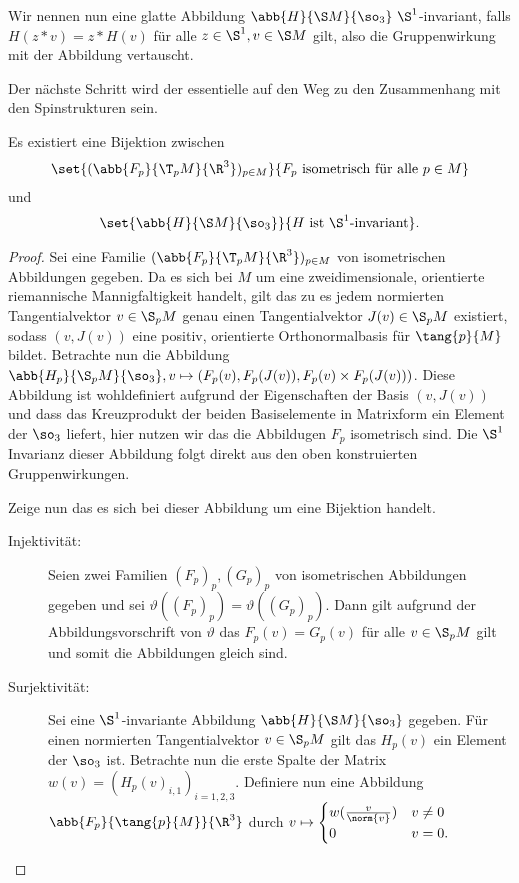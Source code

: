 Wir nennen nun eine glatte Abbildung $ \abb{H}{\S M}{\so_3}~\S^1$-invariant, falls $ H(z*v) = z*H(v) $ für alle $ z \in \S^1, v\in \S M $ gilt, also die Gruppenwirkung mit der Abbildung vertauscht. 
 

Der nächste Schritt wird der essentielle auf den Weg zu den
Zusammenhang mit den Spinstrukturen sein.

\begin{Satz}
  Es existiert eine Bijektion zwischen
  \begin{gather*}
    \set{ (\abb{F_p}{\T_pM}{\R^3})_{p\in M} }{ F_p \text{ isometrisch
        für alle }p \in M}
  \end{gather*}
  und
  \begin{gather*}
    \set{ \abb{H}{\S M}{\so_3}}{H\text{ ist }\S^1 \text{-invariant}}.
  \end{gather*}
  \begin{proof}
    Sei eine Familie $(\abb{F_p}{\T_pM}{\R^3})_{p\in M}$ von
    isometrischen Abbildungen gegeben.  Da es sich bei $M$ um eine
    zweidimensionale, orientierte riemannische Mannigfaltigkeit
    handelt, gilt das zu es jedem normierten Tangentialvektor
    $v \in \S_p M$ genau einen Tangentialvektor $J(v) \in \S_p M$
    existiert, sodass $(v,J(v))$ eine positiv, orientierte
    Orthonormalbasis für $\tang{p}{M}$ bildet. Betrachte nun die
    Abbildung $\abb{H_p}{\S_p%
      M}{\so_3}, v \mapsto (F_p(v),F_p(J(v)),F_p(v)\times F_p(J(v)))$.
    Diese Abbildung ist wohldefiniert aufgrund der Eigenschaften der
    Basis $(v,J(v))$ und dass das Kreuzprodukt der beiden
    Basiselemente in Matrixform ein Element der $\so_3$ liefert, hier nutzen wir das die Abbildugen $ F_p $ isometrisch sind.  Die
    $\S^1$ Invarianz dieser Abbildung folgt direkt aus den oben
    konstruierten Gruppenwirkungen.   
	
    Zeige nun das es sich bei dieser Abbildung um eine Bijektion
    handelt.
    \begin{description}
    \item[Injektivität:] Seien zwei Familien $(F_p)_p,(G_p)_p$ von
      isometrischen Abbildungen gegeben und sei
      $\vartheta((F_p)_p)=\vartheta((G_p)_p)$. Dann gilt aufgrund der
      Abbildungsvorschrift von $\vartheta$ das $F_p(v)=G_p(v)$ für
      alle $v \in \S_p M$ gilt und somit die Abbildungen gleich sind.
    \item[Surjektivität:] Sei eine $\S^1$-invariante Abbildung
      $\abb{H}{\S M}{\so_3}$ gegeben. Für einen normierten
      Tangentialvektor $v \in \S_p M$ gilt das $H_p(v)$ ein Element
      der $\so_3$ ist. Betrachte nun die erste Spalte der Matrix
      $w(v)=(H_p(v)_{i,1})_{i=1,2,3}$. Definiere nun eine Abbildung
      $\abb{F_p}{\tang{p}{M}}{\R^3}$ durch  $v \mapsto \begin{cases}
        w(\frac{v}{\norm{v}}) & v \neq 0 \\
        0 & v=0.
      \end{cases}$
		

\end{description}
\end{proof}
\end{Satz}
